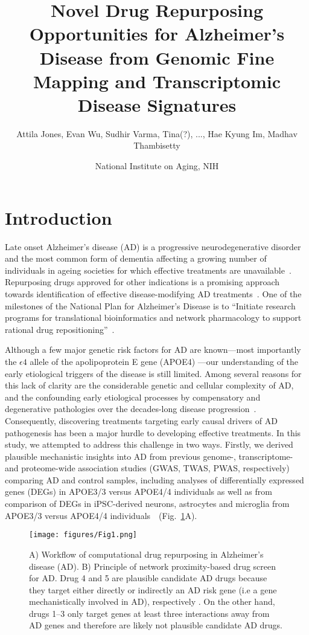 \documentclass[letterpaper]{article}
\title{Novel Drug Repurposing Opportunities for Alzheimer's Disease from
  Genomic Fine Mapping and Transcriptomic Disease Signatures}
\author{Attila Jones, Evan Wu, Sudhir Varma, Tina(?), ..., Hae Kyung Im, Madhav Thambisetty}
\date{National Institute on Aging, NIH}
\begin{document}
\maketitle
\section{Introduction}

Late onset Alzheimer's disease (AD) is a progressive neurodegenerative disorder and the most
common form of dementia affecting a growing number of individuals in ageing
societies for which effective treatments are
unavailable~\citep{Bondi2017,Masters2015}.  Repurposing drugs approved for other indications is
a promising approach  towards identification of effective disease-modifying AD
treatments~\citep{Pushpakom2019,Fang2021,Taubes2021}.  One of the 
milestones of the National Plan for Alzheimer’s Disease is to ``Initiate
research programs for translational bioinformatics and network pharmacology to
support rational drug repositioning''~\citep{NIH/NIA}.%

Although a few major genetic risk factors for AD are known---most importantly
the $\epsilon 4$ allele of the apolipoprotein E gene (APOE4)
\cite{Yamazaki2019}---our understanding of the early etiological triggers of
the disease is still limited.  Among several reasons for this lack of clarity
are the considerable genetic and cellular complexity of AD, and the
confounding early etiological processes by compensatory and degenerative
pathologies over the decades-long disease progression~\citep{DeStrooper2016}.
Consequently, discovering treatments targeting early causal drivers of AD
pathogenesis has been a major hurdle to developing effective treatments.  In
this study, we attempted to address this challenge in two ways.  Firstly, we
derived plausible mechanistic insights into AD from previous genome-,
transcriptome- and proteome-wide association studies (GWAS, TWAS, PWAS,
respectively)~\citep{Jansen2019,Kunkle2019,Gerring2020,Baird2021,Schwartzentruber2021,Wightman2021,Wingo2021}
comparing AD and control samples, including analyses of differentially
expressed genes (DEGs) in APOE3/3 versus APOE4/4 individuals as
well as from comparison of DEGs in iPSC-derived neurons, astrocytes and
microglia from APOE3/3 versus APOE4/4
individuals~\citep{Taubes2021,Lin2018}~(Fig.~\ref{fig:workflow}A).

\begin{figure}
\texttt{[image: figures/Fig1.png]}
\caption{
  A) Workflow of computational drug repurposing in Alzheimer's disease (AD).
  B) Principle of network proximity-based drug screen for AD.  Drug 4 and 5
  are plausible candidate AD drugs because they target either directly or
  indirectly an AD risk gene (i.e a gene mechanistically involved in AD), respectively .  On the other
  hand, drugs 1--3 only target genes at least three interactions away from AD
  genes and therefore are likely not plausible candidate AD drugs.
}
\label{fig:workflow}
\end{figure}
\end{document}
